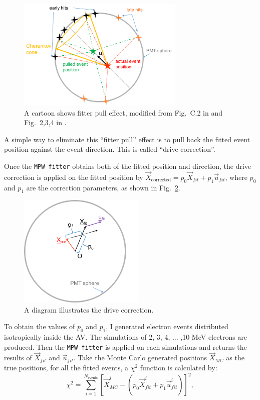 \begin{figure}[!htb]
	\centering
	\includegraphics[width=8cm]{fitterPull.png}
\caption{ A cartoon shows fitter pull effect, modified from Fig.~C.2 in \cite{brice1996monte} and Fig.~2,3,4 in \cite{driveCorPeter}.}
	\label{fitterPull}
\end{figure}

A simple way to eliminate this ``fitter pull'' effect is to pull back the fitted event position against the event direction. This is called ``drive correction''.   

Once the \texttt{MPW fitter} obtains both of the fitted position and direction, the drive correction is applied on the fitted position by $\vec{X}_{\mathrm{corrected}} = p_0\vec{X}_{fit}+p_1\vec{u}_{fit}$, where $p_0$ and $p_1$ are the correction parameters, as shown in Fig.~\ref{drivecor}.
\begin{figure}[!htb]
	\centering
	\includegraphics[width=6cm]{driveCor.png}
	\caption{ A diagram illustrates the drive correction.}
	\label{drivecor}
\end{figure}

To obtain the values of $p_0$ and $p_1$, I generated electron events distributed isotropically inside the AV. The simulations of 2, 3, 4, ... ,10 MeV electrons are produced. Then the \texttt{MPW fitter} is applied on each simulations and returns the results of $\vec{X}_{fit}$ and $\vec{u}_{fit}$. Take the Monte Carlo generated positions $\vec{X}_{MC}$ as the true positions, for all the fitted events, a $\chi^2$ function is calculated by:
\begin{equation}
\chi^2 = \sum_{i=1}^{N_{\mathrm{events}}}[\vec{X}^i_{MC}-(p_0\vec{X}^i_{fit}+p_1\vec{u}^i_{fit})]^2,
\end{equation}

